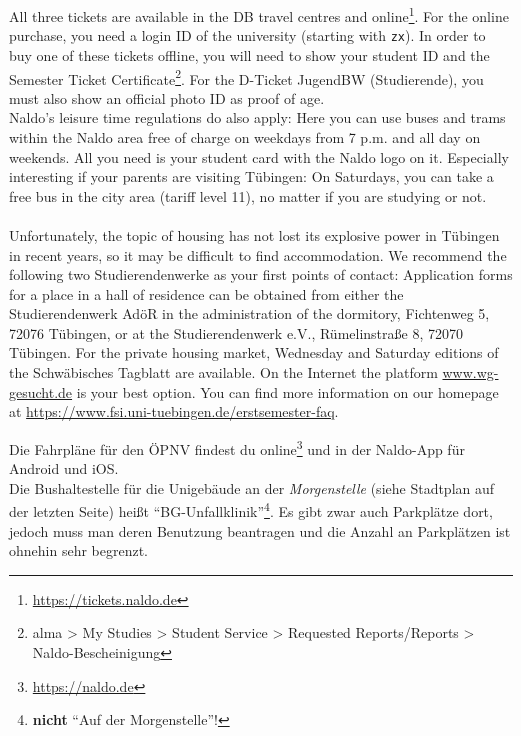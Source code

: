     All three tickets are available in the DB travel centres and online\footnote{\url{https://tickets.naldo.de}}. For the online purchase, you need a login ID of the university (starting with \texttt{zx}).
    In order to buy one of these tickets offline, you will need to show your student ID and the Semester Ticket Certificate\footnote{alma > My Studies > Student Service > Requested Reports/Reports > Naldo-Bescheinigung}. For the D-Ticket JugendBW (Studierende), you must also show an official photo ID as proof of age.\\
    
    Naldo's leisure time regulations do also apply: Here you can use buses and trams within the Naldo area free of charge on weekdays from 7 p.m. and all day on weekends. All you need is your student card with the Naldo logo on it.
    Especially interesting if your parents are visiting Tübingen: On Saturdays, you can take a free bus in the city area (tariff level 11), no matter if you are studying or not.\\ \\

    Unfortunately, the topic of housing has not lost its explosive power in Tübingen in recent years,
    so it may be difficult to find accommodation. We recommend the following two Studierendenwerke as your first points of contact:
    Application forms for a place in a hall of residence can be obtained from either the Studierendenwerk AdöR in the administration of the dormitory,
    Fichtenweg 5, 72076 Tübingen, or at the Studierendenwerk e.V., Rümelinstraße 8, 72070 Tübingen. For the private housing market, Wednesday and Saturday
    editions of the Schwäbisches Tagblatt are available.
    On the Internet the platform \url{www.wg-gesucht.de} is your best option.
    You can find more information on our homepage at \url{https://www.fsi.uni-tuebingen.de/erstsemester-faq}.

\else

    Die Fahrpläne für den ÖPNV  findest du online\footnote{\url{https://naldo.de}} und in der Naldo-App für Android und iOS.\\
    Die Bushaltestelle für die Unigebäude an der \emph{Morgenstelle} (siehe Stadtplan auf der letzten Seite) heißt 
    "`BG-Unfallklinik"'\footnote{\textbf{nicht} "`Auf der Morgenstelle"'!}. Es gibt zwar auch Parkplätze dort,
    jedoch muss man deren Benutzung beantragen und die Anzahl an Parkplätzen ist ohnehin sehr begrenzt.


